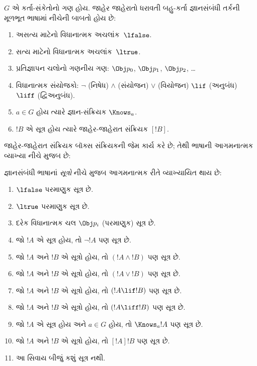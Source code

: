 \begin{defn}
$G$ એ કર્તા-સંકેતોનો ગણ હોય. જાહેર જાહેરાતો ધરાવતી બહુ-કર્તા
જ્ઞાનસંબંધી તર્કની મૂળભૂત ભાષામાં નીચેની બાબતો હોય છે:
\begin{enumerate}
  \item અસત્ય માટેનો વિધાનાત્મક અચલાંક~$\lfalse$.
  \item સત્ય માટેનો વિધાનાત્મક અચલાંક~$\ltrue$.
  \item પ્રતિજ્ઞાપન ચલોનો ગણનીય ગણ: $\Obj
    p_0$, $\Obj p_1$, $\Obj p_2$, \dots
  \item વિધાનાત્મક સંયોજકો: \startycommalist
  \ycomma $\lnot$ (નિષેધ)%
  \ycomma $\land$ (સંયોજન)%
  \ycomma $\lor$ (વિયોજન)%
  \ycomma $\lif$ (અનુબંધ)%
  \ycomma $\liff$ (દ્વિઅનુબંધ).
  \item $a \in G$ હોય ત્યારે જ્ઞાન-સંક્રિયક $\Knows_a$.
  \item $!B$ એ સૂત્ર હોય ત્યારે જાહેર-જાહેરાત
  સંક્રિયક $[!B]$.
\end{enumerate}
\end{defn}


જાહેર-જાહેરાત સંક્રિયક બૉક્સ સંક્રિયકની જેમ કાર્ય કરે છે;
તેથી ભાષાની આગમનાત્મક વ્યાખ્યા નીચે મુજબ છે:

\begin{defn}
  જ્ઞાનસંબંધી ભાષાનાં \emph{સૂત્રો} નીચે મુજબ આગમનાત્મક રીતે
  વ્યાખ્યાયિત થાય છે:
  \begin{enumerate}
  \item $\lfalse$ પરમાણુક સૂત્ર છે.

  \item $\ltrue$ પરમાણુક સૂત્ર છે.

  \item દરેક વિધાનાત્મક ચલ $\Obj p_i$ (પરમાણુક) સૂત્ર છે.

  \item જો $!A$ એ સૂત્ર હોય, તો $\lnot !A$ પણ
  સૂત્ર છે.

  \item જો $!A$ અને $!B$ એ સૂત્રો હોય, તો $(!A \land
  !B)$ પણ સૂત્ર છે.

  \item જો $!A$ અને $!B$ એ સૂત્રો હોય, તો $(!A \lor !B)$
  પણ સૂત્ર છે.

  \item જો $!A$ અને $!B$ એ સૂત્રો હોય, તો $(!A \lif !B)$
  પણ સૂત્ર છે.

  \item જો $!A$ અને $!B$ એ સૂત્રો હોય, તો $(!A \liff !B)$
  પણ સૂત્ર છે.

  \item જો $!A$ એ સૂત્ર હોય અને $a \in G$ હોય, તો $\Knows_a !A$
  પણ સૂત્ર છે.
  
  \item જો $!A$ અને $!B$ એ સૂત્રો હોય, તો $[!A] !B$ પણ
  સૂત્ર છે.

  \item આ સિવાય બીજું કશું સૂત્ર નથી.
\end{enumerate}
\end{defn}

